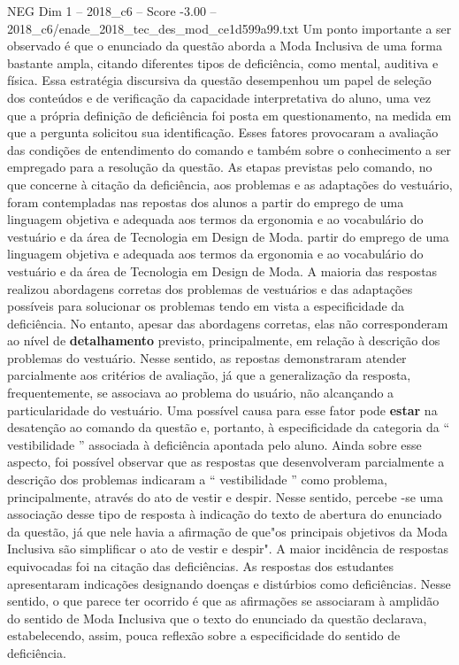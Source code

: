 \begin{textsample}{NEG Dim 1 – 2018\_c6 – Score -3.00 – 2018\_c6/enade\_2018\_tec\_des\_mod\_ce1d599a99.txt}
Um ponto importante a ser observado é que o enunciado da questão aborda a Moda Inclusiva de uma forma bastante ampla, citando diferentes tipos de deficiência, como mental, auditiva e física.
Essa estratégia discursiva da questão desempenhou um papel de seleção dos conteúdos e de verificação da capacidade interpretativa do aluno, uma vez que a própria definição de deficiência foi posta em questionamento, na medida em que a pergunta solicitou sua identificação.
Esses fatores provocaram a avaliação das condições de entendimento do comando e também sobre o conhecimento a ser empregado para a resolução da questão.
As etapas previstas pelo comando, no que concerne à citação da deficiência, aos problemas e as adaptações do vestuário, foram contempladas nas repostas dos alunos a partir do emprego de uma linguagem objetiva e adequada aos termos da ergonomia e ao vocabulário do vestuário e da área de Tecnologia em Design de Moda. partir do emprego de uma linguagem objetiva e adequada aos termos da ergonomia e ao vocabulário do vestuário e da área de Tecnologia em Design de Moda.
A maioria das respostas realizou abordagens corretas dos problemas de vestuários e das adaptações possíveis para solucionar os problemas tendo em vista a especificidade da deficiência.
No entanto, apesar das abordagens corretas, elas não corresponderam ao nível de \textbf{detalhamento} previsto, principalmente, em relação à descrição dos problemas do vestuário.
Nesse sentido, as repostas demonstraram atender parcialmente aos critérios de avaliação, já que a generalização da resposta, frequentemente, se associava ao problema do usuário, não alcançando a particularidade do vestuário.
Uma possível causa para esse fator pode \textbf{estar} na desatenção ao comando da questão e, portanto, à especificidade da categoria da “ vestibilidade ” associada à deficiência apontada pelo aluno.
Ainda sobre esse aspecto, foi possível observar que as respostas que desenvolveram parcialmente a descrição dos problemas indicaram a “ vestibilidade ” como problema, principalmente, através do ato de vestir e despir.
Nesse sentido, percebe -se uma associação desse tipo de resposta à indicação do texto de abertura do enunciado da questão, já que nele havia a afirmação de que"os principais objetivos da Moda Inclusiva são simplificar o ato de vestir e despir".
A maior incidência de respostas equivocadas foi na citação das deficiências.
As respostas dos estudantes apresentaram indicações designando doenças e distúrbios como deficiências.
Nesse sentido, o que parece ter ocorrido é que as afirmações se associaram à amplidão do sentido de Moda Inclusiva que o texto do enunciado da questão declarava, estabelecendo, assim, pouca reflexão sobre a especificidade do sentido de deficiência.

\end{textsample}

